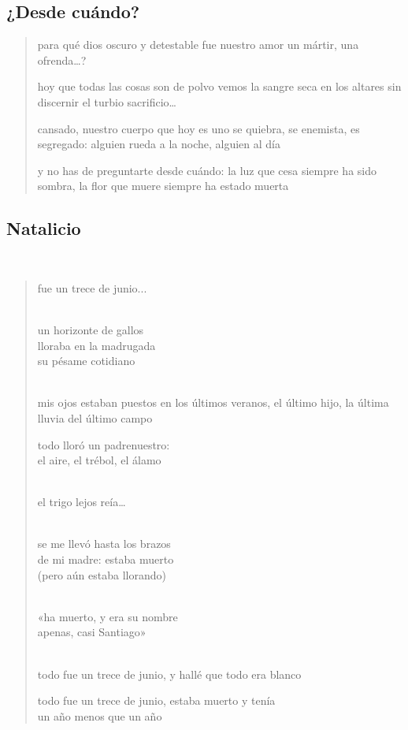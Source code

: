 \documentclass[a4paper, 12pt]{article}
\begin{document}
\pagebreak
\subsection{¿Desde cuándo?}

\begin{verse}

para qué dios oscuro y detestable 
fue nuestro amor un mártir, una ofrenda\ldots?
~ 

hoy que todas las cosas son de polvo 
vemos la sangre seca en los altares
sin discernir el turbio sacrificio\ldots
~ 

cansado, nuestro cuerpo que hoy es uno
se quiebra, se enemista, es segregado:
alguien rueda a la noche, alguien al día
~ 

y no has de preguntarte desde cuándo:
la luz que cesa siempre ha sido sombra,
la flor que muere siempre ha estado muerta

   
\end{verse}

\pagebreak
\subsection{Natalicio}
~ 

\begin{verse}
    
fue un trece de junio...\\
~ 

un horizonte de gallos\\
lloraba en la madrugada\\
su pésame cotidiano\\
~ 

mis ojos estaban puestos
en los últimos veranos,
el último hijo, la última
lluvia del último campo
~

todo lloró un padrenuestro:\\
el aire, el trébol, el álamo\\
~ 

el trigo lejos reía…\\
~ 

se me llevó hasta los brazos\\
de mi madre: estaba muerto\\
(pero aún estaba llorando)\\
~ 

«ha muerto, y era su nombre\\
apenas, casi Santiago»\\
~ 

todo fue un trece de junio,
y hallé que todo era blanco 
~

todo fue un trece de junio,
estaba muerto y tenía\\
un año menos que un año\\
\end{verse}
\end{document}
